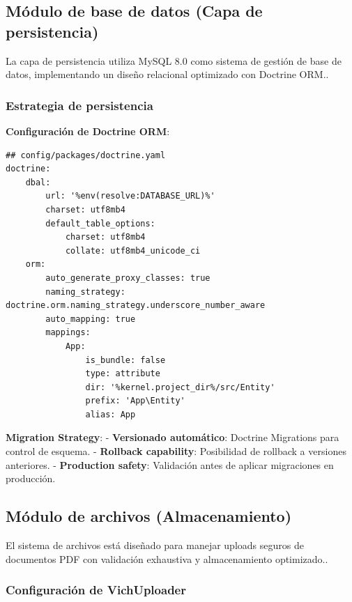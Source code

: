 \documentclass[12pt,a4paper,oneside]{report}
\begin{document}
\subsection{Módulo de base de datos (Capa de
persistencia)}\label{muxf3dulo-de-base-de-datos-capa-de-persistencia}

La capa de persistencia utiliza MySQL 8.0 como sistema de gestión de
base de datos, implementando un diseño relacional optimizado con
Doctrine ORM..

\subsubsection{Estrategia de
persistencia}\label{estrategia-de-persistencia}

\textbf{Configuración de Doctrine ORM}:

\begin{lstlisting}
## config/packages/doctrine.yaml
doctrine:
    dbal:
        url: '%env(resolve:DATABASE_URL)%'
        charset: utf8mb4
        default_table_options:
            charset: utf8mb4
            collate: utf8mb4_unicode_ci
    orm:
        auto_generate_proxy_classes: true
        naming_strategy: doctrine.orm.naming_strategy.underscore_number_aware
        auto_mapping: true
        mappings:
            App:
                is_bundle: false
                type: attribute
                dir: '%kernel.project_dir%/src/Entity'
                prefix: 'App\Entity'
                alias: App
\end{lstlisting}

\textbf{Migration Strategy}: - \textbf{Versionado automático}: Doctrine
Migrations para control de esquema. - \textbf{Rollback capability}:
Posibilidad de rollback a versiones anteriores. - \textbf{Production
safety}: Validación antes de aplicar migraciones en producción.

\subsection{Módulo de archivos
(Almacenamiento)}\label{muxf3dulo-de-archivos-almacenamiento}

El sistema de archivos está diseñado para manejar uploads seguros de
documentos PDF con validación exhaustiva y almacenamiento optimizado..

\subsubsection{Configuración de
VichUploader}\label{configuraciuxf3n-de-vichuploader}
\end{document}
